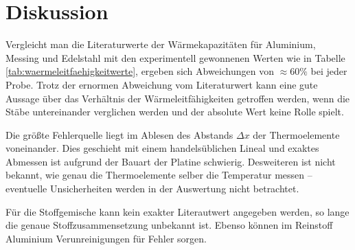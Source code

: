 \section{Diskussion}
\label{sec:Diskussion}
Vergleicht man die Literaturwerte der Wärmekapazitäten für Aluminium, Messing und Edelstahl mit den experimentell gewonnenen Werten wie in Tabelle \ref{tab:waermeleitfaehigkeitwerte}, ergeben sich Abweichungen von $\approx60\%$ bei jeder Probe. Trotz der ernormen Abweichung vom Literaturwert kann eine gute Aussage über das Verhältnis der Wärmeleitfähigkeiten getroffen werden, wenn die Stäbe untereinander verglichen werden und der absolute Wert keine Rolle spielt.

Die größte Fehlerquelle liegt im Ablesen des Abstands $\Delta{x}$ der Thermoelemente voneinander. Dies geschieht mit einem handelsüblichen Lineal und exaktes Abmessen ist aufgrund der Bauart der Platine schwierig. Desweiteren ist nicht bekannt, wie genau die Thermoelemente selber die Temperatur messen -- eventuelle Unsicherheiten werden in der Auswertung nicht betrachtet.

Für die Stoffgemische kann kein exakter Literautwert angegeben werden, so lange die genaue Stoffzusammensetzung unbekannt ist. Ebenso können im Reinstoff Aluminium Verunreinigungen für Fehler sorgen. 
